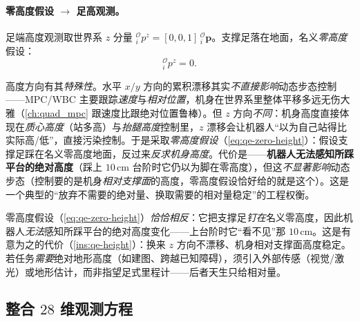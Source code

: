 \paragraph{零高度假设 $\to$ 足高观测。}
足端高度观测取世界系 $z$ 分量 ${}^{\mathcal{O}}_{i}p^z=[0,0,1]\,{}^{\mathcal{O}}_{i}\boldsymbol p$。支撑足落在地面，名义\emph{零高度}假设\cite{yu2021quadruped}：
\begin{equation}
  {}^{\mathcal{O}}_{i}p^z = 0.
  \label{eq:qe-zero-height}
\end{equation}

\begin{insight}[高度漂移的特殊危害与零高度假设]\label{ins:qe-height}
高度方向有其\emph{特殊性}。水平 $x/y$ 方向的累积漂移其实\emph{不直接影响}动态步态控制——MPC/WBC 主要跟踪\emph{速度}与\emph{相对位置}，机身在世界系里整体平移多远无伤大雅（\cref{ch:quad_mpc} 跟速度比跟绝对位置鲁棒）。但 $z$ 方向\emph{不同}：机身高度直接体现在\emph{质心高度}（站多高）与\emph{抬腿高度}控制里，$z$ 漂移会让机器人“以为自己站得比实际高/低”，直接污染控制。于是采取\emph{零高度假设}（\cref{eq:qe-zero-height}）：假设支撑足踩在名义零高度地面，反过来\emph{反求机身高度}。代价是——\textbf{机器人无法感知所踩平台的绝对高度}（踩上 $10\,\mathrm{cm}$ 台阶时它仍以为脚在零高度），但这\emph{不显著影响}动态步态（控制要的是机身\emph{相对支撑面}的高度，零高度假设恰好给的就是这个）。这是一个典型的“放弃不需要的绝对量、换取需要的相对量稳定”的工程权衡。
\end{insight}

\begin{pitfall}[误区：零高度假设让机器人能测台阶高度]
零高度假设（\cref{eq:qe-zero-height}）\emph{恰恰相反}：它把支撑足\emph{钉在}名义零高度，因此机器人\emph{无法}感知所踩平台的绝对高度变化——上台阶时它“看不见”那 $10\,\mathrm{cm}$。这是有意为之的代价（\cref{ins:qe-height}）：换来 $z$ 方向不漂移、机身相对支撑面高度稳定。若任务\emph{需要}绝对地形高度（如建图、跨越已知障碍），须引入外部传感（视觉/激光）或地形估计，而非指望足式里程计——后者天生只给相对量。
\end{pitfall}

\subsection{整合 $28$ 维观测方程}
\label{subsec:qe-obs-assemble}

